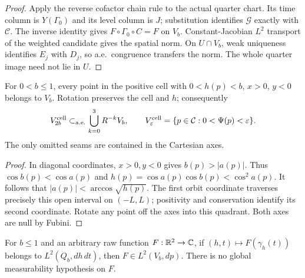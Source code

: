 \begin{proof}
\leanok
Apply the reverse cofactor chain rule to the actual quarter chart.
Its time column is $Y(\Gamma_0)$ and its level column is $J$; substitution
identifies $\mathcal G$ exactly with $\mathcal C$.
The inverse identity gives $F\circ\Gamma_0\circ C=F$ on $V_b$.
Constant-Jacobian $L^2$ transport of the weighted candidate gives the
spatial norm. On $U\cap V_b$, weak uniqueness identifies $E_j$ with $D_j$,
so a.e.\ congruence transfers the norm.
The whole quarter image need not lie in $U$.
\end{proof}

\begin{lemma}
\label{lem:quarter-cell-cover}
\leanok
For $0<b\le1$, every point in the positive cell with
$0<h(p)<b$, $x>0$, $y<0$ belongs to $V_b$.
Rotation preserves the cell and $h$; consequently
\[
 V_{2b}^{\rm cell}\subset_{\rm a.e.}
   \bigcup_{k=0}^3 R^{-k}V_b ,
 \qquad
 V_\varepsilon^{\rm cell}=\{p\in\mathcal{C}:0<\Psi(p)<\varepsilon\}.
\]
The only omitted seams are contained in the Cartesian axes.
\end{lemma}

\begin{proof}
\leanok
In diagonal coordinates, $x>0,y<0$ gives $b(p)>|a(p)|$.
Thus $\cos b(p)<\cos a(p)$ and
$h(p)=\cos a(p)\cos b(p)<\cos^2a(p)$.
It follows that $|a(p)|<\arccos\sqrt{h(p)}$.
The first orbit coordinate traverses precisely this open interval
on $(-L,L)$; positivity and conservation identify its second coordinate.
Rotate any point off the axes into this quadrant. Both axes are null by Fubini.
\end{proof}

\begin{lemma}
\label{lem:quarter-l2-pushforward}
\leanok
For $b\le1$ and an arbitrary raw function $F:\mathbb{R}^2\to\mathbb{C}$, if
$(h,t)\mapsto F(\gamma_h(t))$ belongs to $L^2(Q_b,dh\,dt)$,
then $F\in L^2(V_b,dp)$.
There is no global measurability hypothesis on $F$.
\end{lemma}

